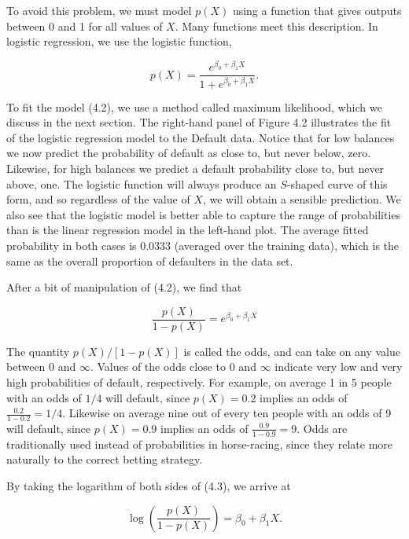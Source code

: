 \documentclass[10pt]{article}
\begin{document}
To avoid this problem, we must model $p(X)$ using a function that gives outputs between 0 and 1 for all values of $X$. Many functions meet this description. In logistic regression, we use the logistic function,


\begin{equation*}
p(X)=\frac{e^{\beta_{0}+\beta_{1} X}}{1+e^{\beta_{0}+\beta_{1} X}} . \tag{4.2}
\end{equation*}


To fit the model (4.2), we use a method called maximum likelihood, which we discuss in the next section. The right-hand panel of Figure 4.2 illustrates the fit of the logistic regression model to the Default data. Notice that for low balances we now predict the probability of default as close to, but never below, zero. Likewise, for high balances we predict a default probability close to, but never above, one. The logistic function will always produce an $S$-shaped curve of this form, and so regardless of the value of $X$, we will obtain a sensible prediction. We also see that the logistic model is better able to capture the range of probabilities than is the linear regression model in the left-hand plot. The average fitted probability in both cases is 0.0333 (averaged over the training data), which is the same as the overall proportion of defaulters in the data set.

After a bit of manipulation of (4.2), we find that


\begin{equation*}
\frac{p(X)}{1-p(X)}=e^{\beta_{0}+\beta_{1} X} \tag{4.3}
\end{equation*}


The quantity $p(X) /[1-p(X)]$ is called the odds, and can take on any value between 0 and $\infty$. Values of the odds close to 0 and $\infty$ indicate very low and very high probabilities of default, respectively. For example, on average 1 in 5 people with an odds of $1 / 4$ will default, since $p(X)=0.2$ implies an odds of $\frac{0.2}{1-0.2}=1 / 4$. Likewise on average nine out of every ten people with an odds of 9 will default, since $p(X)=0.9$ implies an odds of $\frac{0.9}{1-0.9}=9$. Odds are traditionally used instead of probabilities in horse-racing, since they relate more naturally to the correct betting strategy.

By taking the logarithm of both sides of (4.3), we arrive at


\begin{equation*}
\log \left(\frac{p(X)}{1-p(X)}\right)=\beta_{0}+\beta_{1} X . \tag{4.4}
\end{equation*}
\end{document}
